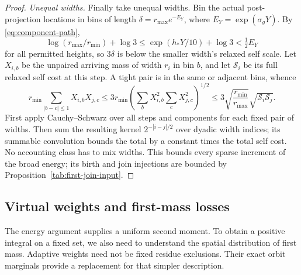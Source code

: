 \begin{proof}
\emph{Unequal widths.}\quad
Finally take unequal widths.  Bin the actual post-projection
locations in bins of length $\delta=r_{\max}e^{-E_Y}$, where
$E_Y=\exp(\sigma_gY)$.  By \eqref{eq:component-path},
\[
 \log(r_{\max}/r_{\min})+\log3
 \le \exp(h_*Y/10)+\log3<\tfrac12E_Y
\]
for all permitted heights, so $3\delta$ is below the smaller
width's relaxed self scale.  Let $X_{i,b}$ be the unpaired
arriving mass of width $r_i$ in bin $b$, and let $\mathcal S_i$
be its full relaxed self cost at this step.  A tight pair is
in the same or adjacent bins, whence
\[
 r_{\min}\sum_{|b-c|\le1}X_{i,b}X_{j,c}
 \le3r_{\min}
       \left(\sum_bX_{i,b}^2\sum_cX_{j,c}^2\right)^{1/2}
 \le3\sqrt{\frac{r_{\min}}{r_{\max}}}
       \sqrt{\mathcal S_i\mathcal S_j}.
\]
First apply Cauchy--Schwarz over all steps and components for
each fixed pair of widths.  Then sum the resulting kernel
$2^{-|i-j|/2}$ over dyadic width indices; its summable convolution
bounds the total by a constant times the total self cost.  No
accounting class has to mix widths.  This bounds every sparse
increment of the broad energy; its birth and join injections are
bounded by Proposition~\ref{tab:first-join-input}.
\end{proof}

\subsection{Virtual weights and first-mass losses}

The energy argument supplies a uniform second moment.  To obtain
a positive integral on a fixed set, we also need to understand the
spatial distribution of first mass.  Adaptive weights need not be
fixed residue exclusions.  Their exact orbit marginals provide a
replacement for that simpler description.

